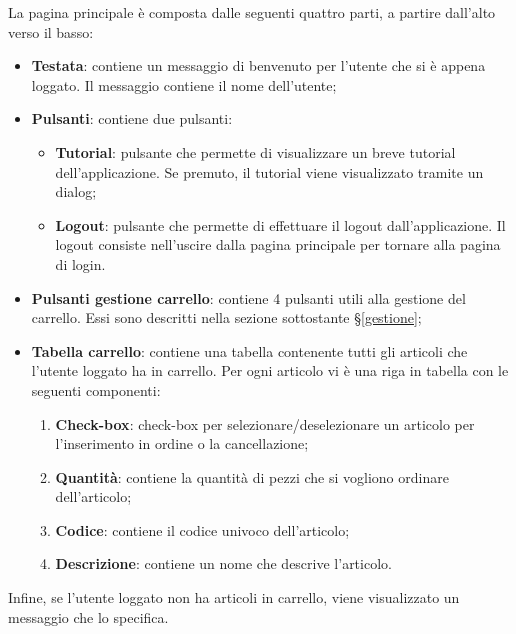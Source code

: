 La pagina principale è composta dalle seguenti quattro parti, a partire dall'alto verso il basso:
\begin{itemize}
	\item \textbf{Testata}: contiene un messaggio di benvenuto per l'utente che si è appena loggato. Il messaggio contiene il nome dell'utente;
	\item \textbf{Pulsanti}: contiene due pulsanti:
	\begin{itemize}
		\item \textbf{Tutorial}: pulsante che permette di visualizzare un breve tutorial dell'applicazione. Se premuto, il tutorial viene 
		visualizzato tramite un dialog;
		\item \textbf{Logout}: pulsante che permette di effettuare il logout dall'applicazione. Il logout consiste nell'uscire dalla pagina
		principale per tornare alla pagina di login.
	\end{itemize}
	\item \textbf{Pulsanti gestione carrello}: contiene 4 pulsanti utili alla gestione del carrello. Essi sono descritti nella sezione sottostante §\ref{gestione};
	\item \textbf{Tabella carrello}: contiene una tabella contenente tutti gli articoli che l'utente loggato ha in carrello. Per ogni articolo vi è una riga in tabella con le seguenti componenti:
	\begin{enumerate}
		\item \textbf{Check-box}: check-box per selezionare/deselezionare un articolo per l'inserimento in ordine o la cancellazione;
		\item \textbf{Quantità}: contiene la quantità di pezzi che si vogliono ordinare dell'articolo;
		\item \textbf{Codice}: contiene il codice univoco dell'articolo;
		\item \textbf{Descrizione}: contiene un nome che descrive l'articolo.
	\end{enumerate}
\end{itemize}

Infine, se l'utente loggato non ha articoli in carrello, viene visualizzato un messaggio che lo specifica.

